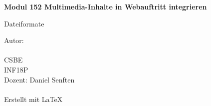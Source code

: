 
\begin{titlepage}
    \begin{center}
        \vspace*{2.5cm}

        \Huge
        \textbf{Modul 152 Multimedia-Inhalte in Webauftritt integrieren}

        \vspace{0.5cm}
        \LARGE
        Dateiformate

        \vfill


        \vspace{0.8cm}

        \Large
        Autor: \gitAuthorName\\
        \gitAuthorEmail\\
        CSBE\\
        INF18P\\
        Dozent: Daniel Senften\\
        \gitAuthorDate\\
        \small
        \vspace{1cm}
        Erstellt mit \LaTeX\\
        \vspace{1cm}
        \gitStyler
    \end{center}
\end{titlepage}